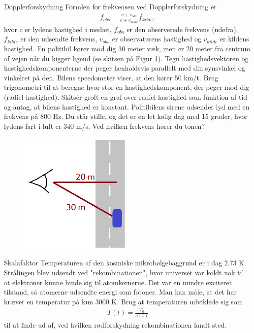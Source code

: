 \begin{opgave}{Dopplerforskydning}%
	Formlen for frekvensen ved Dopplerforskydning er
	\begin{align}
		f_{obs} = \frac{c+v_{obs}}{c+v_{kilde}} f_{kilde},
	\end{align}
	hvor $c$ er lydens hastighed i mediet, $f_{obs}$ er den observerede frekvens (udefra), $f_{kilde}$ er den udsendte frekvens, $v_{obs}$ er observatørens hastighed og $v_{kilde}$ er kildens hastighed.
	\opg En politibil kører mod dig 30 meter væk, men er 20 meter fra centrum af vejen når du kigger ligeud (se skitsen på Figur \ref{politi}). Tegn hastighedsvektoren og hastighedskomponenterne der peger henholdsvis parallelt med din synsvinkel og vinkelret på den. 
	\opg Bilens speedometer viser, at den kører 50 km/t. Brug trigonometri til at beregne hvor stor en hastighedskomponent, der peger mod dig (radiel hastighed). Skitsér groft en graf over radiel hastighed som funktion af tid og antag, at bilens hastighed er konstant.
	\opg Politibilens sirene udsender lyd med en frekvens på 800 Hz. Du står stille, og det er en let kølig dag med 15 grader, hvor lydens fart i luft er 340 m/s. Ved hvilken frekvens hører du tonen?
	\begin{figure}[h!]
		\centering
		\includegraphics[width=0.5\textwidth]{opg/figurer/Politi.png}
		\caption{}
		\label{politi}
	\end{figure}
\end{opgave}

\begin{opgave}{Skalafaktor}%
	Temperaturen af den kosmiske mikrobølgebaggrund er i dag 2.73 K. Strålingen blev udsendt ved "rekombinationen", hvor universet var koldt nok til at elektroner kunne binde sig til atomkernerne. Det var en mindre exciteret tilstand, så atomerne udsendte energi som fotoner. Man kan måle, at det har krævet en temperatur på kun 3000 K. Brug at temperaturen udviklede sig som
	\begin{align}
		T(t)=\frac{T_0}{a(t)}
	\end{align}
	til at finde ud af, ved hvilken rødforskydning rekombinationen fandt sted.
\end{opgave}

